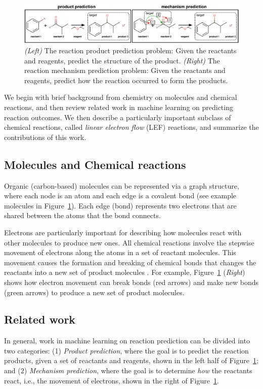 
\begin{figure}[t!]
\centering
\includegraphics[width=\textwidth]{reaction_diagram.pdf}
\caption{\emph{(Left)} The reaction product prediction problem: Given the reactants and reagents, predict the structure of the product. \emph{(Right)} The reaction mechanism prediction problem: Given the reactants and reagents, predict how the reaction occurred to form the products.}
\label{fig:task-overview}

\end{figure}

We begin with brief background from chemistry on molecules and chemical reactions, and
then review related work in machine learning on predicting reaction outcomes. 
We then describe a particularly important subclass of chemical reactions, called \emph{linear electron flow} (LEF) reactions,
and summarize the contributions of this work.



\subsection{Molecules and Chemical reactions}
Organic (carbon-based) molecules can be represented via a graph structure, where each node is an atom and each edge is a covalent bond (see example molecules in Figure~\ref{fig:task-overview}).
Each edge (bond) represents two electrons that are shared between the atoms that the bond connects. 

Electrons are particularly important for describing how molecules react with other molecules to produce new ones. All chemical reactions involve the stepwise movement of electrons along the atoms in a set of reactant molecules. 
This movement causes the formation and breaking of chemical bonds that changes the reactants into a new set of product molecules \citep{herges1994coarctate}. For example, Figure~\ref{fig:task-overview} (\emph{Right}) shows how electron movement can break bonds (red arrows) and make new bonds (green arrows) to produce a new set of product molecules.

\subsection{Related work}
In general, work in machine learning on reaction prediction can be divided into two categories: (1) \emph{Product prediction}, where the goal is to predict the reaction products, given a set of reactants and reagents, shown in the left half of Figure~\ref{fig:task-overview}; and (2) \emph{Mechanism prediction}, where the goal is to determine {\em how} the reactants react, i.e., the movement of electrons, shown in the right of Figure~\ref{fig:task-overview}.


